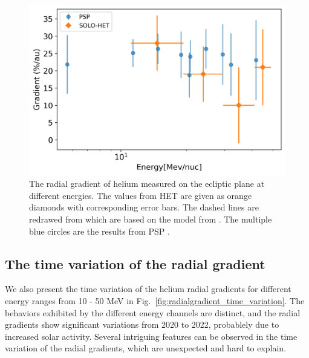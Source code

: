 \begin{figure}[!htb]
    \centering
    \includegraphics{images/ACR/Energydependent_normal_mask20230612.png}
    \caption[Energy dependency of helium radial gradient]{The radial gradient of helium measured on the ecliptic plane at different energies. The values from \ac{HET} are given as orange diamonds with corresponding error bars. The dashed lines are redrawed from \citet{Rankin2021ApJ} which are based on the model from \citet{Strauss2010JGRA}. The multiple blue circles are the results from \ac{PSP} \citep{Rankin2021ApJ}.}
    \label{fig:comparison_SOLO_PSP}
\end{figure}



\subsection*{The time variation of the radial gradient}

We also present the time variation of the helium radial gradients for different energy ranges from 10 - 50 MeV in Fig.~\ref{fig:radialgradient_time_variation}. The behaviors exhibited by the different energy channels are distinct, and the radial gradients show significant variations from 2020 to 2022, probablely due to increased solar activity. Several intriguing features can be observed in the time variation of the radial gradients, which are unexpected and hard to explain.

